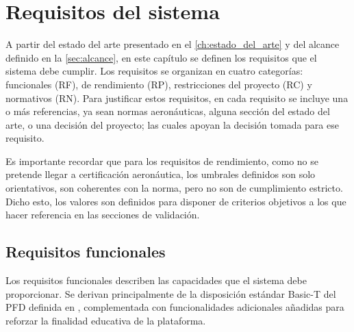 
\chapter{Requisitos del sistema}
\label{ch:requisitos}

A partir del estado del arte presentado en el \cref{ch:estado_del_arte} y del
alcance definido en la \cref{sec:alcance}, en este capítulo se definen los
requisitos que el sistema debe cumplir. Los requisitos se organizan en cuatro
categorías: funcionales (RF), de rendimiento (RP), restricciones del proyecto
(RC) y normativos (RN). Para justificar estos requisitos, en cada requisito se incluye una o más referencias, ya sean normas aeronáuticas, alguna sección del estado del arte, o una decisión del proyecto; las cuales apoyan la decisión tomada para ese requisito.

Es importante recordar que para los requisitos de rendimiento, como no se pretende llegar a certificación aeronáutica, los umbrales definidos son solo orientativos, son coherentes con la norma, pero no son de cumplimiento estricto. Dicho esto, los valores son definidos para disponer de criterios objetivos a los que hacer referencia en las secciones de validación.


\section{Requisitos funcionales}
\label{sec:req_funcionales}

Los requisitos funcionales describen las capacidades que el sistema debe
proporcionar. Se derivan principalmente de la disposición estándar Basic-T del PFD definida en \cite{ac25_11b}, complementada con funcionalidades adicionales añadidas para reforzar la finalidad educativa de la plataforma.

